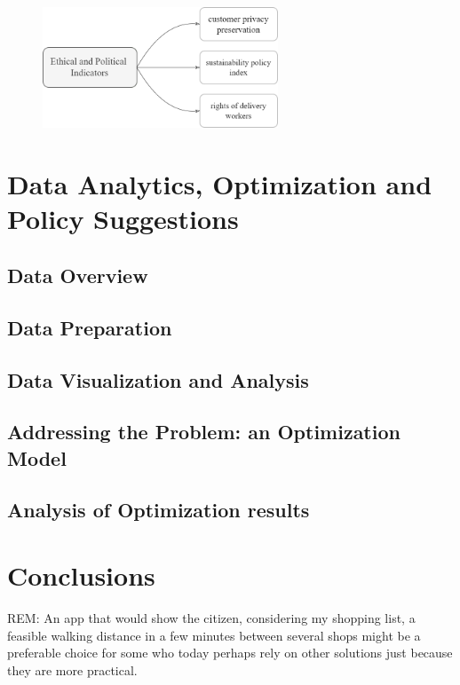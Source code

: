 
    \begin{figure}[h!]
        \centering
        \includegraphics[width=7cm]{figs/ethic}
        \label{fig:env}
      \end{figure}






\newpage
\section{Data Analytics, Optimization and Policy Suggestions}

\subsection{Data Overview}

\subsection{Data Preparation}

\subsection{Data Visualization and Analysis}

\subsection{Addressing the Problem: an Optimization Model}

\subsection{Analysis of Optimization results}

\section*{Conclusions}

REM: 
An app that would show the citizen, considering my shopping list, a feasible walking distance in a few minutes between several shops might be a preferable choice for some who today perhaps rely on other solutions just because they are more practical.

\newpage




